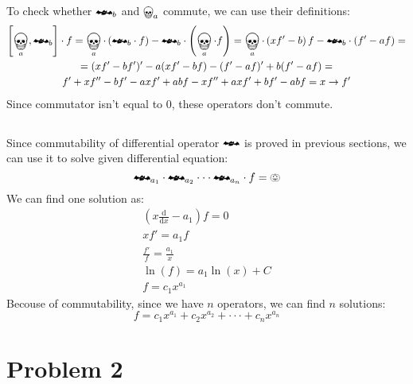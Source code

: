 \documentclass[12pt]{article}
\begin{document}
\subsection{}
To check whether $\mathrightbat_b$ and $\bigskull_a$ commute, we can use their definitions:
\begin{multline}
    \left[\bigskull_a,\mathrightbat_b\right]\cdot f = \bigskull_a\cdot\left(\mathrightbat_b\cdot f\right) - \mathrightbat_b\cdot\left(\bigskull_a\cdot f\right) = \bigskull_a\cdot\left(xf' - b\right)f - \mathrightbat_b\cdot\left(f'-af\right) =\\
    = (xf'-bf')' - a(xf'-bf) - (f'-af)' + b(f'-af) = \\ f' + xf'' -bf' - axf' + abf - xf'' +axf' +bf' -abf = x\rightarrow f'
\end{multline}
Since commutator isn't equal to 0, these operators don't commute.
\subsection{}
Since commutability of differential operator $\mathrightbat$ is proved in previous sections, we can use it to solve given differential equation:
\begin{equation}
    \mathrightbat_{a_1}\cdot\mathrightbat_{a_2}\cdot\cdot\cdot\mathrightbat_{a_n}\cdot f = \pumpkin
\end{equation}
We can find one solution as:
\begin{equation}
    \begin{split}
        \left(x \frac{\mathrm{d}}{\mathrm{d}x}-a_1\right)f = 0\\
        xf' = a_1f\\
        \frac{f'}{f} = \frac{a_1}{x}\\
        \ln(f) = a_1\ln(x) + C\\
        f = c_1x^{a_1}
    \end{split}
\end{equation}
Becouse of commutability, since we have $n$ operators, we can find $n$ solutions:
\begin{equation}
    f = c_1x^{a_1} + c_2x^{a_2} + \cdot\cdot\cdot + c_nx^{a_n}
\end{equation}
\section{Problem 2}
\end{document}
